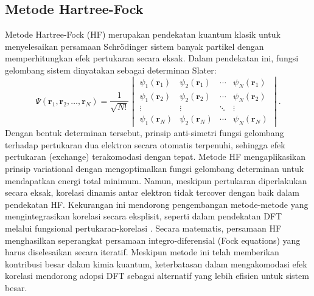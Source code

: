 \subsection{Metode Hartree-Fock}
Metode Hartree-Fock (HF) merupakan pendekatan kuantum klasik untuk menyelesaikan persamaan Schrödinger sistem banyak partikel dengan memperhitungkan efek pertukaran secara eksak.
Dalam pendekatan ini, fungsi gelombang sistem dinyatakan sebagai determinan Slater:
\begin{equation}
    \Psi(\mathbf{r}_1,\mathbf{r}_2,\ldots,\mathbf{r}_N) = \frac{1}{\sqrt{N!}}
    \begin{vmatrix}
    \psi_1(\mathbf{r}_1) & \psi_2(\mathbf{r}_1) & \cdots & \psi_N(\mathbf{r}_1) \\
    \psi_1(\mathbf{r}_2) & \psi_2(\mathbf{r}_2) & \cdots & \psi_N(\mathbf{r}_2) \\
    \vdots & \vdots & \ddots & \vdots \\
    \psi_1(\mathbf{r}_N) & \psi_2(\mathbf{r}_N) & \cdots & \psi_N(\mathbf{r}_N)
    \end{vmatrix}.
\end{equation}
Dengan bentuk determinan tersebut, prinsip anti-simetri fungsi gelombang terhadap pertukaran dua elektron secara otomatis terpenuhi, sehingga efek pertukaran (exchange) terakomodasi dengan tepat.
Metode HF mengaplikasikan prinsip variational dengan mengoptimalkan fungsi gelombang determinan untuk mendapatkan energi total minimum.
Namun, meskipun pertukaran diperlakukan secara eksak, korelasi dinamis antar elektron tidak tercover dengan baik dalam pendekatan HF.
Kekurangan ini mendorong pengembangan metode-metode yang mengintegrasikan korelasi secara eksplisit, seperti dalam pendekatan DFT melalui fungsional pertukaran-korelasi \citep{Martin2004}.
Secara matematis, persamaan HF menghasilkan seperangkat persamaan integro-diferensial (Fock equations) yang harus diselesaikan secara iteratif.
Meskipun metode ini telah memberikan kontribusi besar dalam kimia kuantum, keterbatasan dalam mengakomodasi efek korelasi mendorong adopsi DFT sebagai alternatif yang lebih efisien untuk sistem besar.

